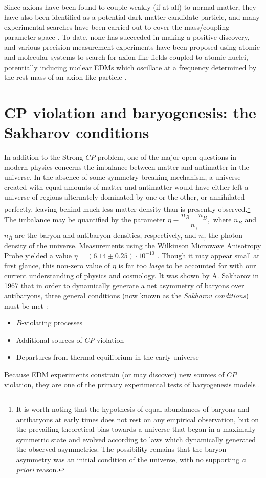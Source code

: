 \documentclass [10pt, twoside] {uwthesis}[2012/04/02]
\begin{document}
Since axions have been found to couple weakly (if at all) to normal matter, they have also been identified as a potential dark matter candidate particle, and many experimental searches have been carried out to cover the mass/coupling parameter space \cite{2005_Rosenberg_axion_review}. To date, none has succeeded in making a positive discovery, and various precision-measurement experiments have been proposed using atomic and molecular systems to search for axion-like fields coupled to atomic nuclei, potentially inducing nuclear EDMs which oscillate at a frequency determined by the rest mass of an axion-like particle \cite{2013_Graham_and_Rajendran_Direct_ALP_Detection, 2014_Budker_CASPEr_proposal, 2014_Flambaum_axion}. 

\section{CP violation and baryogenesis: the Sakharov conditions}
In addition to the Strong $CP$ problem, one of the major open questions in modern physics concerns the imbalance between matter and antimatter in the universe. In the absence of some symmetry-breaking mechanism, a universe created with equal amounts of matter and antimatter would have either left a universe of regions alternately dominated by one or the other, or annihilated perfectly, leaving behind much less matter density than is presently observed.\footnote{It is worth noting that the hypothesis of equal abundances of baryons and antibaryons at early times does not rest on any empirical observation, but on the prevailing theoretical bias towards a universe that began in a maximally-symmetric state and evolved according to laws which dynamically generated the observed asymmetries. The possibility remains that the baryon asymmetry was an initial condition of the universe, with no supporting \textit{a priori} reason.} The imbalance may be quantified by the parameter $\eta\equiv\dfrac{n_B-n_{\overline{B}}}{n_{\gamma}},$ where $n_B$ and $n_{\overline{B}}$ are the baryon and antibaryon densities, respectively, and $n_{\gamma}$ the photon density of the universe. Measurements using the Wilkinson Microwave Anisotropy Probe yielded a value $\eta=(6.14\pm0.25)\cdot10^{-10}$ \cite{ClineNotes}. Though it may appear small at first glance, this non-zero value of $\eta$ is far too \textit{large} to be accounted for with our current understanding of physics and cosmology. It was shown by A. Sakharov in 1967 that in order to dynamically generate a net asymmetry of baryons over antibaryons, three general conditions (now known as the \textit{Sakharov conditions}) must be met \cite{1967_Sakharov}: \begin{itemize}\item $B$-violating processes \item Additional sources of $CP$ violation \item Departures from thermal equilibrium in the early universe\end{itemize} Because EDM experiments constrain (or may discover) new sources of $CP$ violation, they are one of the primary experimental tests of baryogenesis models \cite{2010_EDM_Baryogenesis}. 
\end{document}
